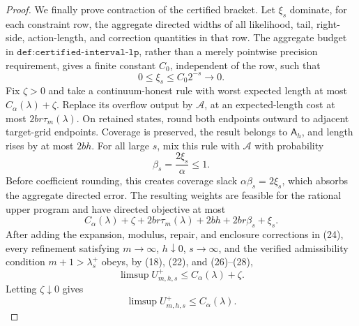 \documentclass{article}
\begin{document}
\begin{proof}
We finally prove contraction of the certified bracket.  Let \(\xi_s\)
dominate, for each constraint row, the aggregate directed widths of all
likelihood, tail, right-side, action-length, and correction quantities in
that row.  The aggregate budget in
\(\texttt{def:certified-interval-lp}\), rather than a merely pointwise
precision requirement, gives a finite constant \(C_0\), independent of
the row, such that
\[
 0\leq\xi_s\leq C_0 2^{-s}\longrightarrow0.
 \tag{26}
\]
Fix \(\zeta>0\) and take a continuum-honest rule with worst expected
length at most \(C_\alpha(\lambda)+\zeta\).  Replace its overflow output
by \(\mathcal A\), at an expected-length cost at most
\(2br\tau_m(\lambda)\).  On retained states, round both endpoints outward
to adjacent target-grid endpoints.  Coverage is preserved, the result
belongs to \(\mathsf A_h\), and length rises by at most \(2bh\).  For all
large \(s\), mix this rule with \(\mathcal A\) with probability
\[
 \beta_s=\frac{2\xi_s}{\alpha}\leq1.
 \tag{27}
\]
Before coefficient rounding, this creates coverage slack
\(\alpha\beta_s=2\xi_s\), which absorbs the aggregate directed error.
The resulting weights are feasible for the rational upper program and
have directed objective at most
\[
 C_\alpha(\lambda)+\zeta+2br\tau_m(\lambda)+2bh
 +2br\beta_s+\xi_s.
 \tag{28}
\]
After adding the expansion, modulus, repair, and enclosure corrections in
(24), every refinement satisfying
\(m\to\infty\), \(h\downarrow0\), \(s\to\infty\), and the verified
admissibility condition \(m+1>\lambda_s^+\) obeys, by (18), (22), and
(26)--(28),
\[
 \limsup U_{m,h,s}^+\leq C_\alpha(\lambda)+\zeta.
\]
Letting \(\zeta\downarrow0\) gives
\[
 \limsup U_{m,h,s}^+\leq C_\alpha(\lambda).
 \tag{29}
\]


\end{proof}
\end{document}
